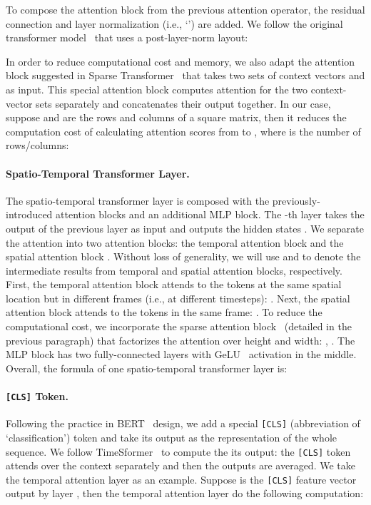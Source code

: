 To compose the attention block from the previous attention operator, the residual connection and layer normalization (i.e., `') are added.
We follow the original transformer model~\cite{vaswani2017attention} that uses a post-layer-norm layout:

In order to reduce computational cost and memory, we also adapt the attention block suggested in Sparse Transformer~\cite{child2019generating} that takes two sets of context vectors  and  as input.
This special attention block computes attention for the two context-vector sets separately and concatenates their output together.
In our case, suppose  and  are the rows and columns of a square matrix, then it reduces the computation cost of calculating attention scores from  to , where  is the number of rows/columns:

\paragraph{Spatio-Temporal Transformer Layer.} 
The spatio-temporal transformer layer is composed with the previously-introduced attention blocks and an additional MLP block.
The -th layer takes the output of the previous layer  as input and outputs the hidden states .
We separate the attention into two attention blocks: the temporal attention block  and the spatial attention block .
Without loss of generality, we will use  and  to denote the intermediate results from temporal and spatial attention blocks, respectively.
First, the temporal attention block attends to the tokens at the same spatial location but in different frames (i.e., at different timesteps): .
Next, the spatial attention block attends to the tokens in the same frame: .
To reduce the computational cost, we incorporate the sparse attention block~\cite{child2019generating} (detailed in the previous paragraph) that factorizes the attention over height and width: , .
The MLP block has two fully-connected layers with GeLU~\cite{hendrycks2016gaussian} activation in the middle.
Overall, the formula of one spatio-temporal transformer layer is:

\paragraph{\texttt{[CLS]} Token.} 
Following the practice in BERT~\cite{devlin2019bert} design, we add a special \texttt{[CLS]} (abbreviation of `classification') token and take its output as the representation of the whole sequence.
We follow TimeSformer~\cite{bertasius2021space} to compute the its output: the \texttt{[CLS]} token attends over the context separately and then the outputs are averaged. We take the temporal attention layer as an example.
Suppose  is the \texttt{[CLS]} feature vector output by layer , then the temporal attention layer do the following computation:

